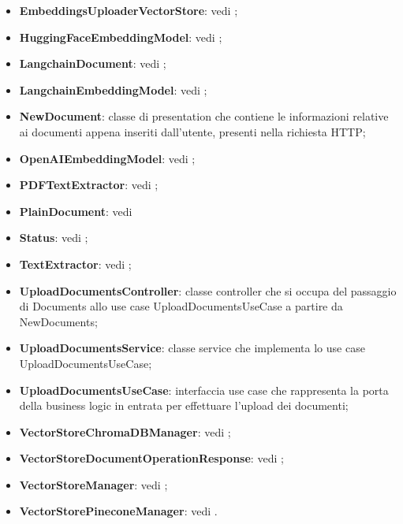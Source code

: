 \documentclass[10pt, a4paper]{article}
\begin{document}
\begin{itemize}
    \item \textbf{EmbeddingsUploaderVectorStore}: vedi ;
    \item \textbf{HuggingFaceEmbeddingModel}: vedi ;
    \item \textbf{LangchainDocument}: vedi ;
    \item \textbf{LangchainEmbeddingModel}: vedi ;
    \item \label{NewDocument}\textbf{NewDocument}: classe di presentation che contiene le informazioni relative ai documenti appena inseriti dall'utente, presenti nella richiesta HTTP;
    \item \textbf{OpenAIEmbeddingModel}: vedi ;
    \item \textbf{PDFTextExtractor}: vedi ;
    \item \textbf{PlainDocument}: vedi 
    \item \textbf{Status}: vedi ;
    \item \textbf{TextExtractor}: vedi ;
    \item \label{UploadDocumentsController}\textbf{UploadDocumentsController}: classe controller che si occupa del passaggio di Documents allo use case UploadDocumentsUseCase a partire da NewDocuments;
    \item \label{UploadDocumentsService}\textbf{UploadDocumentsService}: classe service che implementa lo use case UploadDocumentsUseCase;
    \item \label{UploadDocumentsUseCase}\textbf{UploadDocumentsUseCase}: interfaccia use case che rappresenta la porta della business logic in entrata per effettuare l'upload dei documenti;
    \item \textbf{VectorStoreChromaDBManager}: vedi ;
    \item \textbf{VectorStoreDocumentOperationResponse}: vedi ;
    \item \textbf{VectorStoreManager}: vedi ;
    \item \textbf{VectorStorePineconeManager}: vedi .
    
\end{itemize}
\end{document}
